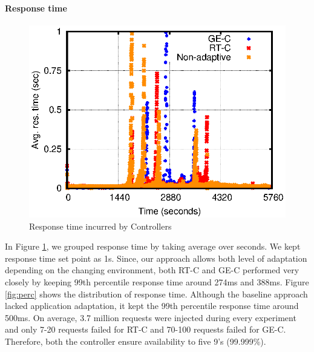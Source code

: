 
\paragraph*{\textbf{Response time}}
\begin{figure} [htb]
\centering
\includegraphics[scale=.8]{Graphs/responseTime.eps}
\caption{Response time incurred by Controllers}
\label{fig:rt}
\end{figure}
In Figure \ref{fig:rt}, we grouped response time by taking average over seconds. We kept response time set point as 1s. Since, our approach allows both level of adaptation depending on the changing environment, both RT-C and GE-C performed very closely by keeping 99th percentile response time around 274ms and 388ms. Figure \ref{fig:perc} shows the distribution of response time. Although the baseline approach lacked application adaptation, it kept the 99th percentile response time around 500ms. On average, 3.7 million requests were injected during every experiment and only 7-20 requests failed for RT-C and 70-100 requests failed for GE-C. Therefore, both the controller ensure availability to five 9's (99.999\%).


